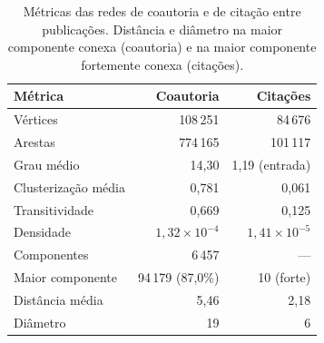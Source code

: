 \begin{table}[htbp]
\centering
\small
\caption{Métricas das redes de coautoria e de citação entre publicações. Distância e diâmetro na maior componente conexa (coautoria) e na maior componente fortemente conexa (citações).}
\label{tab:metricas}
\begin{tabular}{lrr}
\hline
Métrica & Coautoria & Citações \\
\hline
Vértices & 108\,251 & 84\,676 \\
Arestas & 774\,165 & 101\,117 \\
Grau médio & 14{,}30 & 1{,}19 (entrada) \\
Clusterização média & 0{,}781 & 0{,}061 \\
Transitividade & 0{,}669 & 0{,}125 \\
Densidade & $1{,}32 \times 10^{-4}$ & $1{,}41 \times 10^{-5}$ \\
Componentes & 6\,457 & --- \\
Maior componente & 94\,179 (87{,}0\%) & 10 (forte) \\
Distância média & 5{,}46 & 2{,}18 \\
Diâmetro & 19 & 6 \\
\hline
\end{tabular}
\end{table}
